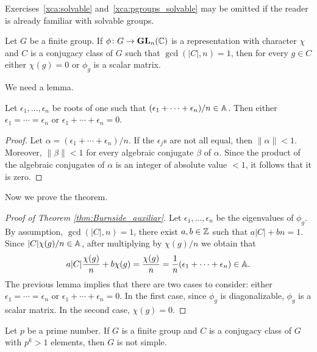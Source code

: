 Exercises~\ref{xca:solvable} and~\ref{xca:pgroups_solvable} may be omitted if the reader is already familiar with solvable groups.

\begin{theorem}[Burnside]
	\label{thm:Burnside_auxiliar}
	Let $G$ be a finite group. If $\phi\colon G\to\mathbf{GL}_n(\mathbb{C})$ is a representation
	with character $\chi$ and $C$ is a conjugacy class of $G$ such that 
	$\gcd(|C|,n)=1$, then for every $g\in C$ either 
	$\chi(g)=0$ or $\phi_g$ is a scalar matrix. 
\end{theorem}

We need a lemma.

\begin{lemma}
	\label{lem:4Burnside}
	Let $\epsilon_1,\dots,\epsilon_n$ be roots of one such that 
	$(\epsilon_1+\cdots+\epsilon_n)/n\in\mathbb{A}$. Then either 
	$\epsilon_1=\cdots=\epsilon_n$ or 
	$\epsilon_1+\cdots+\epsilon_n=0$.
\end{lemma}

\begin{proof}
	Let $\alpha=(\epsilon_1+\cdots+\epsilon_n)/n$.
	If the $\epsilon_j$s are not all equal, then $\|\alpha\|<1$. Moreover, 
	$\|\beta\|<1$ for every algebraic conjugate $\beta$ of $\alpha$. Since the product 
	of the algebraic conjugates of $\alpha$ is an integer of absolute value 
	$<1$, it follows that it is zero. 
\end{proof}

Now we prove the theorem.

\begin{proof}[Proof of Theorem \ref{thm:Burnside_auxiliar}]
	Let $\epsilon_1,\dots,\epsilon_n$ be the eigenvalues of $\phi_g$. By assumption, 
	$\gcd(|C|,n)=1$, there exist $a,b\in\mathbb{Z}$ such that $a|C|+bn=1$. Since 
	$|C|\chi(g)/n\in\mathbb{A}$, after multiplying by $\chi(g)/n$ we obtain that  
	\[
		a|C|\frac{\chi(g)}{n}+b\chi(g)=\frac{\chi(g)}{n}=\frac{1}{n}(\epsilon_1+\cdots+\epsilon_n)\in\mathbb{A}.
	\]
	The previous lemma implies that there are two cases to consider: 
	either $\epsilon_1=\cdots=\epsilon_n$ or $\epsilon_1+\cdots+\epsilon_n=0$. In the first
	case, since $\phi_g$ is diagonalizable, $\phi_g$ is a scalar matrix. 
	In the second case, $\chi(g)=0$.
\end{proof}

\begin{theorem}[Burnside]
    \label{thm:pq_notsimple}
	Let $p$ be a prime number. If $G$ is a finite group and 
	$C$ is a conjugacy class of $G$ with $p^k>1$ elements, then $G$ 
	is not simple.
\end{theorem}


